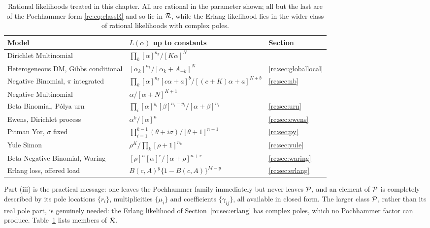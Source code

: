 \begin{table}[htbp]
\centering\small
\setlength{\tabcolsep}{4pt}
\begin{tabular}{@{}>{\raggedright\arraybackslash}p{1.45in}>{\raggedright\arraybackslash}p{1.75in}>{\raggedright\arraybackslash}p{1.05in}@{}}
\toprule
Model & $L(\alpha)$ up to constants & Section\\
\midrule
Dirichlet Multinomial & $\prod_k[\alpha]^{n_k}/[K\alpha]^N$ & \citet{rc:wang2024}\\
Heterogeneous DM, Gibbs conditional & $[\alpha_k]^{n_k}/[\alpha_k+A_{-k}]^N$ & \ref{rc:sec:globallocal}\\
Negative Binomial, $\pi$ integrated & $\prod_k[\alpha]^{n_k}[c\alpha+a]^b/\allowbreak[(c+K)\alpha+a]^{N+b}$ & \ref{rc:sec:nb}\\
Negative Multinomial & $\alpha/[\alpha+N]^{K+1}$ & \citet{rc:wang2024}\\
Beta Binomial, P\'olya urn & $\prod_i[\alpha]^{y_i}[\beta]^{n_i-y_i}/[\alpha+\beta]^{n_i}$ & \ref{rc:sec:urn}\\
Ewens, Dirichlet process & $\alpha^k/[\alpha]^n$ & \ref{rc:sec:ewens}\\
Pitman Yor, $\sigma$ fixed & $\prod_{i=1}^{k-1}(\theta+i\sigma)/[\theta+1]^{n-1}$ & \ref{rc:sec:py}\\
Yule Simon & $\rho^K/\prod_k[\rho+1]^{n_k}$ & \ref{rc:sec:yule}\\
Beta Negative Binomial, Waring & $[\rho]^n[\alpha]^r/[\alpha+\rho]^{n+r}$ & \ref{rc:sec:waring}\\
Erlang loss, offered load & $B(c,A)^y\{1-B(c,A)\}^{M-y}$ & \ref{rc:sec:erlang}\\
\bottomrule
\end{tabular}
\caption{Rational likelihoods treated in this chapter. All are rational in the parameter shown; all but the last are of the Pochhammer form \eqref{rc:eq:classR} and so lie in $\mathcal{R}$, while the Erlang likelihood lies in the wider class of rational likelihoods with complex poles.}\label{rc:tab:members}
\end{table}

Part (iii) is the practical message: one leaves the Pochhammer family immediately but never leaves $\mathcal{P}$, and an element of $\mathcal{P}$ is completely described by its pole locations $\{r_i\}$, multiplicities $\{\mu_i\}$ and coefficients $\{\gamma_{ij}\}$, all available in closed form. The larger class $\mathcal{P}$, rather than its real pole part, is genuinely needed: the Erlang likelihood of Section~\ref{rc:sec:erlang} has complex poles, which no Pochhammer factor can produce. Table~\ref{rc:tab:members} lists members of $\mathcal{R}$.

